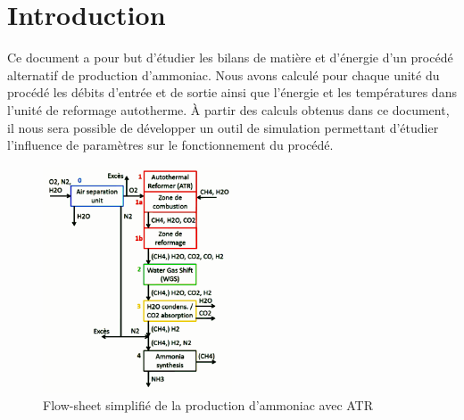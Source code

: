 \documentclass[french, a4paper, 10pt]{article}
\begin{document}

\tableofcontents

\newpage
\part{Introduction}
Ce document a pour but d'étudier les bilans de matière et d'énergie d'un procédé alternatif de production d'ammoniac. Nous avons calculé pour chaque unité du procédé les débits d'entrée et de sortie ainsi que l'énergie et les températures dans l'unité de reformage autotherme. À partir des calculs obtenus dans ce document, il nous sera possible de développer un outil de simulation permettant d'étudier l'influence de paramètres sur le fonctionnement du procédé. 
\begin{figure}[h]
	\centering
	\includegraphics[width=0.5\textwidth]{pictures/procede.pdf}
	\caption{\label{fig:procede}Flow-sheet simplifié de la production d'ammoniac avec ATR}
\end{figure}
\end{document}

